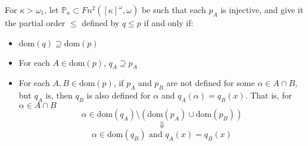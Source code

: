 \documentclass{beamer}
\theoremstyle{theorem}
\theoremstyle{definition}
\newcommand{\<}{\langle}
\renewcommand{\>}{\rangle}
\newcommand{\po}{\mathbb{P}}
\newcommand{\pok}{\po_\kappa}
\newcommand{\dom}{\textrm{dom}}
\begin{document}
\begin{frame}
  \begin{definition}
    For $\kappa>\omega_1$, let $\pok\subset Fn^2([\kappa]^\omega,\omega)$ be such that each $p_A$ is injective, and give it the partial order $\leq$ defined by $q\leq p$ if and only if:
          \begin{itemize}
            \item $\dom(q)\supseteq\dom(p)$
            \item For each $A\in\dom(p)$, $q_A\supseteq p_A$
            \item For each $A,B\in\dom(p)$, if $p_A$ and $p_B$ are not defined for some $\alpha\in A\cap B$, but $q_A$ is, then $q_B$ is also defined for $\alpha$ and $q_A(\alpha)=q_B(x)$. That is, for $\alpha\in A\cap B$
              \[
                \alpha\in \dom(q_A)\setminus(\dom(p_A)\cup\dom(p_B))
              \]
              \[
                \Downarrow
              \]
              \[
                \alpha\in\dom(q_B) \text{ and } q_A(x)=q_B(x)
              \]
          \end{itemize}
  \end{definition}
\end{frame}
\end{document}
